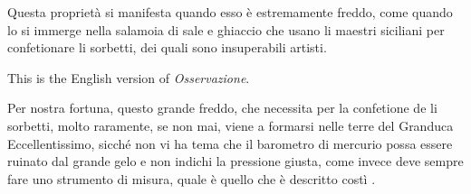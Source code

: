 \begin{osservazione}\normalfont
Questa propriet\`a si manifesta quando esso \`e estremamente freddo, come quando lo si immerge nella salamoia di sale e ghiaccio che usano li maestri siciliani per confetionare li sorbetti, dei quali sono insuperabili artisti.
\end{osservazione}
%
\begin{observation}\normalfont
This is the English version of \emph{Osservazione}.
\end{observation}

Per nostra fortuna, questo grande freddo, che necessita per la confetione de li sorbetti, molto raramente, se non mai, viene a formarsi nelle terre del Granduca Eccellentissimo, sicch\'e non vi ha tema che il barometro di mercurio possa essere ruinato dal grande gelo e non indichi la pressione giusta, come invece deve sempre fare uno strumento di misura, quale \`e quello che \`e descritto cost\`i \cite{duane1964}.
